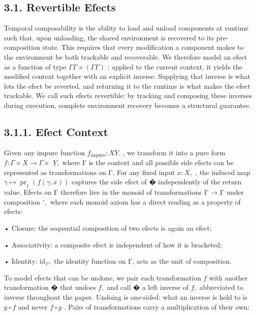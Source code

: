 \documentclass[
  10
]{article}
\begin{document}
\subsection{3.1. Revertible Efects}\label{revertible-efects}

Temporal composability is the ability to load and unload components at
runtime such that, upon unloading, the shared environment is recovered
to its pre-composition state. This requires that every modification a
component makes to the environment be both trackable and recoverable. We
therefore model an efect as a function of type
\(\Gamma  \Gamma \times ( \Gamma  \Gamma )\) : applied to the current
context, it yields the modified context together with an explicit
inverse. Supplying that inverse is what lets the efect be reverted, and
returning it to the runtime is what makes the efect trackable. We call
such efects revertible: by tracking and composing these inverses during
execution, complete environment recovery becomes a structural guarantee.

\subsection{3.1.1. Efect Context}\label{efect-context}

Given any impure function \(f _ { \mathrm { i m p u r e } } : X  Y .\) ,
we transform it into a pure form
\(f : \Gamma \times X \to \Gamma \times\) \(Y ,\) where Γ is the context
and all possible side efects can be represented as transformations on Γ.
For any fixed input \(x : X ,\) , the induced map
\(\gamma \mapsto \operatorname { p r } _ { 1 } ( f ( \gamma , x ) )\)
captures the side efect of � independently of the return value. Efects
on Γ therefore live in the monoid of transformations Γ → Γ under
composition \(^ \circ ,\) where each monoid axiom has a direct reading
as a property of efects:

• Closure: the sequential composition of two efects is again an efect;

• Associativity: a composite efect is independent of how it is
bracketed;

• Identity: \({ \mathrm { i d } } _ { \Gamma } ,\) the identity function
on Γ, acts as the unit of composition.

To model efects that can be undone, we pair each transformation \(f\)
with another transformation � that undoes \(f ,\) and call � a left
inverse of \(f ,\) abbreviated to inverse throughout the paper. Undoing
is one-sided: what an inverse is held to is \(g \circ f\) and never
\(f \circ g\) . Pairs of transformations carry a multiplication of their
own:
\end{document}
